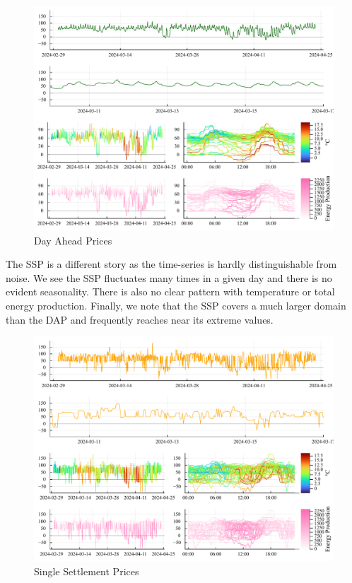 \documentclass[
  journal,
]{IEEEtran}%
\begin{document}
\begin{figure}

{\centering \includegraphics{EnergyProdConformalLSTM_files/mediabag/EnergyProdConformalLSTM_files/figure-pdf/monthly-dap-energy-price-plots-output-1.pdf}

}

\caption{Day Ahead Prices}

\end{figure}%

The SSP is a different story as the time-series is hardly
distinguishable from noise. We see the SSP fluctuates many times in a
given day and there is no evident seasonality. There is also no clear
pattern with temperature or total energy production. Finally, we note
that the SSP covers a much larger domain than the DAP and frequently
reaches near its extreme values.

\begin{figure}

{\centering \includegraphics{EnergyProdConformalLSTM_files/mediabag/EnergyProdConformalLSTM_files/figure-pdf/monthly-ssp-energy-price-plots-output-1.pdf}

}

\caption{Single Settlement Prices}

\end{figure}%
\end{document}

